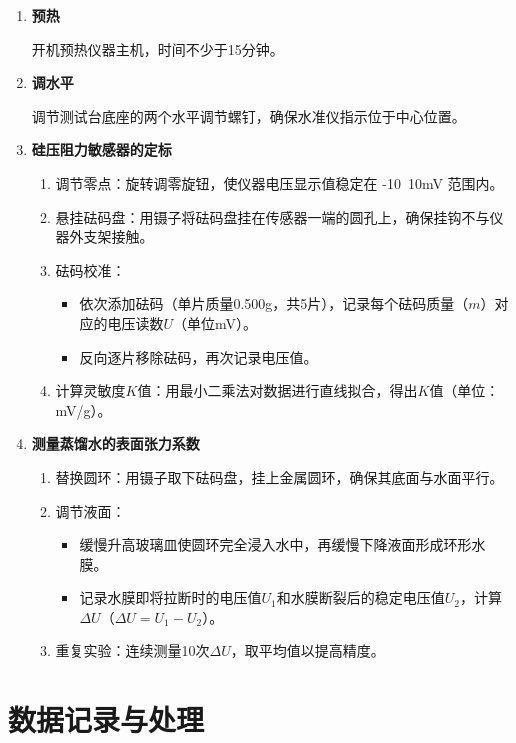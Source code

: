 \documentclass[12pt,a4paper]{article}
\begin{document}
\begin{enumerate}
\item \textbf{预热}

开机预热仪器主机，时间不少于15分钟。

\item \textbf{调水平}

调节测试台底座的两个水平调节螺钉，确保水准仪指示位于中心位置。

\item \textbf{硅压阻力敏感器的定标}

\begin{enumerate}
\item 调节零点：旋转调零旋钮，使仪器电压显示值稳定在 -10~10mV 范围内。
\item 悬挂砝码盘：用镊子将砝码盘挂在传感器一端的圆孔上，确保挂钩不与仪器外支架接触。
\item 砝码校准：
\begin{itemize}
\item 依次添加砝码（单片质量0.500g，共5片），记录每个砝码质量（$m$）对应的电压读数$U$（单位mV）。
\item 反向逐片移除砝码，再次记录电压值。
\end{itemize}
\item 计算灵敏度$K$值：用最小二乘法对数据进行直线拟合，得出$K$值（单位：mV/g）。
\end{enumerate}

\item \textbf{测量蒸馏水的表面张力系数}

\begin{enumerate}
\item 替换圆环：用镊子取下砝码盘，挂上金属圆环，确保其底面与水面平行。
\item 调节液面：
\begin{itemize}
\item 缓慢升高玻璃皿使圆环完全浸入水中，再缓慢下降液面形成环形水膜。
\item 记录水膜即将拉断时的电压值$U_1$和水膜断裂后的稳定电压值$U_2$，计算$\Delta U$（$\Delta U = U_1 - U_2$）。
\end{itemize}
\item 重复实验：连续测量10次$\Delta U$，取平均值以提高精度。
\end{enumerate}
\end{enumerate}

\section{数据记录与处理}
\end{document}
